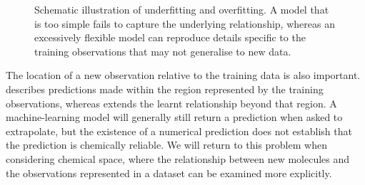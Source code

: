 \begin{figure}[htbp]
{%
  }

  \caption{
    Schematic illustration of underfitting and overfitting.
    A model that is too simple fails to capture the underlying relationship, whereas an excessively flexible model can reproduce details specific to the training observations that may not generalise to new data.
  }
  \label{fig2-4:overfitting}
\end{figure}

The location of a new observation relative to the training data is also important.
 describes predictions made within the region represented by the training observations, whereas  extends the learnt relationship beyond that region.
A machine-learning model will generally still return a prediction when asked to extrapolate, but the existence of a numerical prediction does not establish that the prediction is chemically reliable.
We will return to this problem when considering chemical space, where the relationship between new molecules and the observations represented in a dataset can be examined more explicitly.

